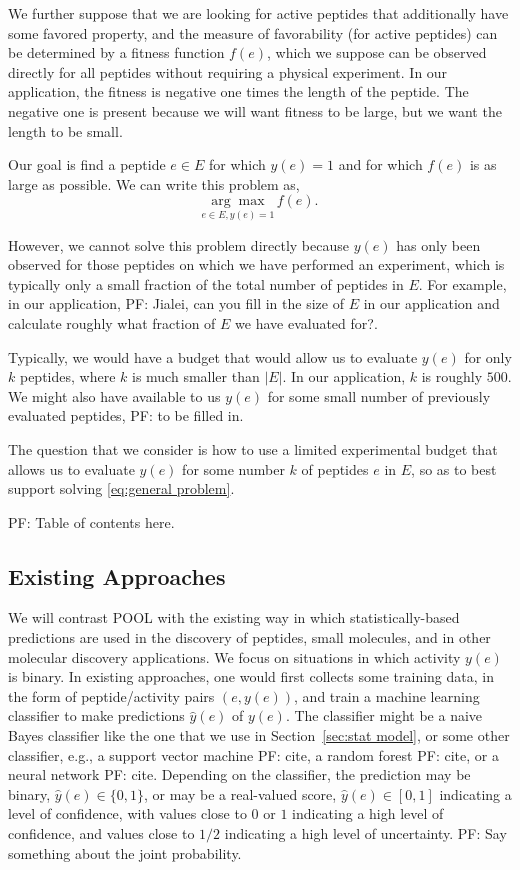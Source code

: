 \documentclass[11pt]{article}
\newcommand{\pfcomment}[1]{{\color{blue} PF: #1}}
\begin{document}
We further suppose that we are looking for active peptides that additionally have some
favored property, and the measure of favorability (for active peptides) can be
determined by a fitness function $f(e)$, which we suppose can be observed directly for all peptides without requiring a physical experiment. In our application, the fitness is negative one times the length of the peptide.  The negative one is present because we will want fitness to be large, but we want the length to be small.

Our goal is find a peptide $e\in E$ for which $y(e)=1$ and for which $f(e)$ is as large as possible.  We can write this problem as,
\begin{equation}
  \underset{e \in E, y(e) = 1}{\arg\max} \, f(e).
  \label{eq:general problem}
\end{equation}

However, we cannot solve this problem directly because $y(e)$ has only been observed for those peptides on which we have performed an experiment, which is typically only a small fraction of the total number of peptides in $E$.  For example, in our application, \pfcomment{Jialei, can you fill in the size of $E$ in our application and calculate roughly what fraction of $E$ we have evaluated for?}.

Typically, we would have a budget that would allow us to evaluate $y(e)$ for only $k$ peptides, where $k$ is much smaller than $|E|$.  
In our application, $k$ is roughly $500$.
We might also have available to us $y(e)$ for some small number of previously evaluated peptides, 
\pfcomment{to be filled in.}


The question that we consider is how to use a limited experimental budget that allows us to evaluate $y(e)$ for some number $k$ of peptides $e$ in $E$, so as to best support solving \eqref{eq:general problem}.

\pfcomment{Table of contents here.}

\subsection{Existing Approaches}

We will contrast POOL with the existing way in which statistically-based predictions are used in the discovery of peptides, small molecules, and in other molecular discovery applications.
We focus on situations in which activity $y(e)$ is binary. In existing approaches, one would first collects some training data, in the form of peptide/activity pairs $(e,y(e))$, and train a machine learning classifier to make predictions $\hat{y}(e)$ of $y(e)$.  The classifier might be a naive Bayes classifier like the one that we use in Section~\ref{sec:stat model}, or some other classifier, e.g., a support vector machine \pfcomment{cite}, a random forest \pfcomment{cite}, or a neural network\pfcomment{cite}.
Depending on the classifier, the prediction may be binary, $\hat{y}(e) \in \{0,1\}$, or may be a real-valued score, $\hat{y}(e) \in [0,1]$ indicating a level of confidence, with values close to $0$ or $1$ indicating a high level of confidence, and values close to $1/2$ indicating a high level of uncertainty.  \pfcomment{Say something about the joint probability.}
\end{document}
